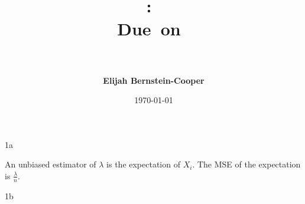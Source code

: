 \documentclass{article}
\title{\vspace{0in}
    \textmd{\textbf{\hmwkClass:\ \hmwkTitle}}\\
    \normalsize\vspace{0.1in}\small{Due\ on\ \hmwkDueDate}\\
    \vspace{0.1in}\large{\textit{\hmwkClassInstructor\ \hmwkClassTime}}
    \vspace{0.5in}}
\author{\textbf{Elijah Bernstein-Cooper}}
\date{\today} %
\begin{document}
\maketitle

\begin{homeworkProblem}

    \begin{homeworkSection}{1a}

        An unbiased estimator of $\lambda$ is the expectation of $X_i$. The MSE
        of the expectation is $\frac{\lambda}{n}$.
    
    \end{homeworkSection}

    \begin{homeworkSection}{1b}
        

        
    \end{homeworkSection}

\end{homeworkProblem}
\end{document}

